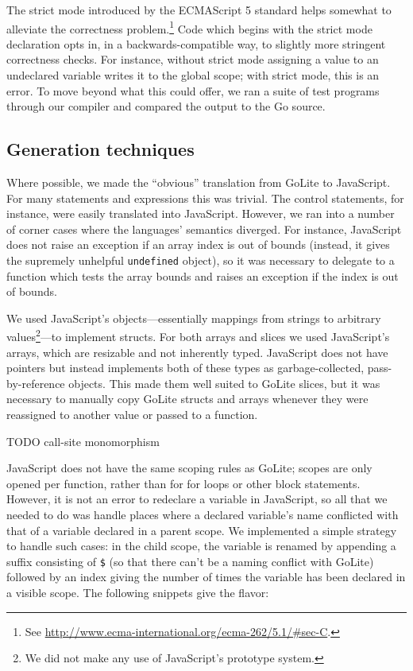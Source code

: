 \documentclass[oneside]{article}
\begin{document}
The strict mode introduced by the ECMAScript 5 standard helps somewhat to alleviate the correctness problem.\footnote{See \url{http://www.ecma-international.org/ecma-262/5.1/\#sec-C}.} Code which begins with the strict mode declaration opts in, in a backwards-compatible way, to slightly more stringent correctness checks. For instance, without strict mode assigning a value to an undeclared variable writes it to the global scope; with strict mode, this is an error. To move beyond what this could offer, we ran a suite of test programs through our compiler and compared the output to the Go source.

\subsection{Generation techniques}\label{subsec:gentech}
Where possible, we made the ``obvious'' translation from GoLite to JavaScript. For many statements and expressions this was trivial. The control statements, for instance, were easily translated into JavaScript. However, we ran into a number of corner cases where the languages' semantics diverged. For instance, JavaScript does not raise an exception if an array index is out of bounds (instead, it gives the supremely unhelpful \texttt{undefined} object), so it was necessary to delegate to a function which tests the array bounds and raises an exception if the index is out of bounds.

We used JavaScript's objects---essentially mappings from strings to arbitrary values\footnote{We did not make any use of JavaScript's prototype system.}---to implement structs. For both arrays and slices we used JavaScript's arrays, which are resizable and not inherently typed. JavaScript does not have pointers but instead implements both of these types as garbage-collected, pass-by-reference objects. This made them well suited to GoLite slices, but it was necessary to manually copy GoLite structs and arrays whenever they were reassigned to another value or passed to a function.

TODO call-site monomorphism

JavaScript does not have the same scoping rules as GoLite; scopes are only opened per function, rather than for for loops or other block statements. However, it is not an error to redeclare a variable in JavaScript, so all that we needed to do was handle places where a declared variable's name conflicted with that of a variable declared in a parent scope. We implemented a simple strategy to handle such cases: in the child scope, the variable is renamed by appending a suffix consisting of \texttt{\$} (so that there can't be a naming conflict with GoLite) followed by an index giving the number of times the variable has been declared in a visible scope. The following snippets give the flavor:
\end{document}
